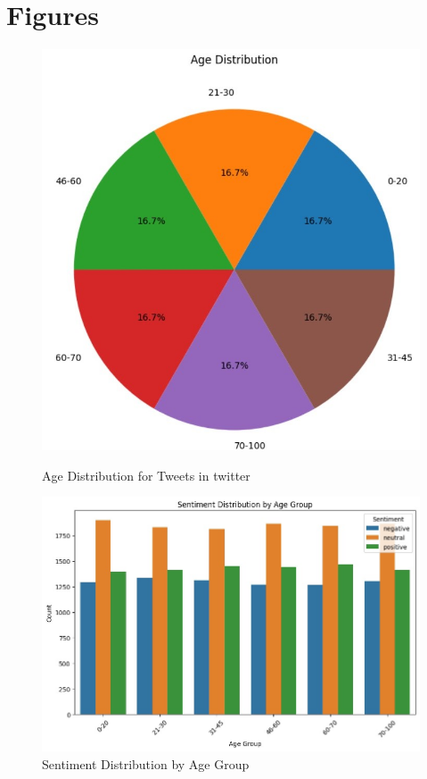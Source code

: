 \documentclass[a4paper]{article}
\theoremstyle{plain}
\theoremstyle{definition}
\begin{document}
\section{Figures}
\begin{figure}[htbp]
    \begin{minipage}[b]{0.45\textwidth}
        \centering
        \includegraphics[width=\textwidth]{figs/1.jpg}
        \caption*{Age Distribution for Tweets in twitter}
        \label{fig:figure1}
    \end{minipage}
    \hfill
    \begin{minipage}[b]{0.45\textwidth}
        \centering
        \includegraphics[width=\textwidth]{figs/2.jpg}
        \caption*{Sentiment Distribution by Age Group}
        \label{fig:figure2}
    \end{minipage}
    

\end{figure}
\end{document}
